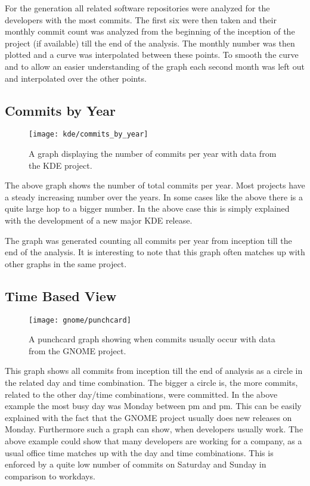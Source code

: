 For the generation all related software repositories were analyzed for the
developers with the most commits. The first six were then taken and their
monthly commit count was analyzed from the beginning of the inception of the
project (if available) till the end of the analysis. The monthly number was
then plotted and a curve was interpolated between these points. To smooth the
curve and to allow an easier understanding of the graph each second month was
left out and interpolated over the other points.



\subsection{Commits by Year} %

\begin{figure}[h!]
  \centering
  \texttt{[image: kde/commits\_by\_year]}
  \caption{A graph displaying the number of commits per year with data from the
  KDE project.}
\end{figure}

The above graph shows the number of total commits per year. Most projects have
a steady increasing number over the years. In some cases like the above there
is a quite large hop to a bigger number. In the above case this is simply
explained with the development of a new major KDE release.

The graph was generated counting all commits per year from inception till the
end of the analysis. It is interesting to note that this graph often matches up
with other graphs in the same project.


\subsection{Time Based View} %

\begin{figure}[h!]
  \centering
  \texttt{[image: gnome/punchcard]}
  \caption{A punchcard graph showing when commits usually occur with data from
  the GNOME project.}
\end{figure}

This graph shows all commits from inception till the end of analysis as a
circle in the related day and time combination. The bigger a circle is, the
more commits, related to the other day/time combinations, were committed. In
the above example the most busy day was Monday between \unit[4]{pm} and
\unit[12]{pm}. This can be easily explained with the fact that the GNOME
project usually does new releases on Monday. Furthermore such a graph can show,
when developers usually work. The above example could show that many developers
are working for a company, as a usual office time matches up with the day and
time combinations. This is enforced by a quite low number of commits on
Saturday and Sunday in comparison to workdays.

